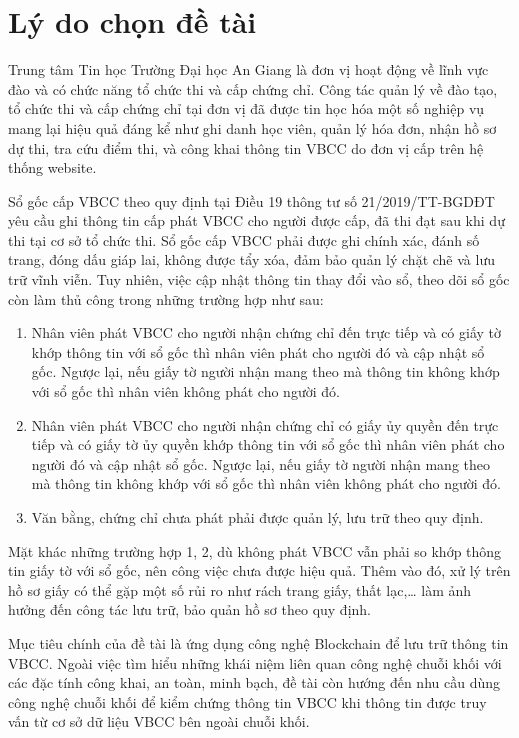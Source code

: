 \section{Lý do chọn đề tài}

Trung tâm Tin học Trường Đại học An Giang là đơn vị hoạt động về lĩnh vực đào và có chức năng tổ chức thi và cấp chứng chỉ.
Công tác quản lý về đào tạo, tổ chức thi và cấp chứng chỉ tại đơn vị đã được tin học hóa một số nghiệp vụ mang lại hiệu quả đáng kể như ghi danh học viên, quản lý hóa đơn, nhận hồ sơ dự thi, tra cứu điểm thi, và công khai thông tin VBCC do đơn vị cấp trên hệ thống website.

Sổ gốc cấp VBCC theo quy định tại Điều 19 thông tư số 21/2019/TT-BGDĐT yêu cầu ghi thông tin cấp phát VBCC cho người được cấp, đã thi đạt sau khi dự thi tại cơ sở tổ chức thi. Sổ gốc cấp VBCC phải được ghi chính xác, đánh số trang, đóng dấu giáp lai, không được tẩy xóa, đảm bảo quản lý chặt chẽ và lưu trữ vĩnh viễn. Tuy nhiên, việc cập nhật thông tin thay đổi vào sổ, theo dõi sổ gốc còn làm thủ công trong những trường hợp như sau:

\begin{enumerate}
\item Nhân viên phát VBCC cho người nhận chứng chỉ đến trực tiếp và có giấy tờ khớp thông tin với sổ gốc thì nhân viên phát cho người đó và cập nhật sổ gốc. Ngược lại, nếu giấy tờ người nhận mang theo mà thông tin không khớp với sổ gốc thì nhân viên không phát cho người đó.

\item Nhân viên phát VBCC cho người nhận chứng chỉ có giấy ủy quyền đến trực tiếp và có giấy tờ ủy quyền khớp thông tin với sổ gốc thì nhân viên phát cho người đó và cập nhật sổ gốc. Ngược lại, nếu giấy tờ người nhận mang theo mà thông tin không khớp với sổ gốc thì nhân viên không phát cho người đó.

\item Văn bằng, chứng chỉ chưa phát phải được quản lý, lưu trữ theo quy định.
\end{enumerate}

Mặt khác những trường hợp 1, 2, dù không phát VBCC vẫn phải so khớp thông tin giấy tờ với sổ gốc, nên công việc chưa được hiệu quả. Thêm vào đó, xử lý trên hồ sơ giấy có thể gặp một số rủi ro như rách trang giấy, thất lạc,\ldots{} làm ảnh hưởng đến công tác lưu trữ, bảo quản hồ sơ theo quy định.

Mục tiêu chính của đề tài là ứng dụng công nghệ Blockchain để lưu trữ thông tin VBCC. Ngoài việc tìm hiểu những khái niệm liên quan công nghệ chuỗi khối với các đặc tính công khai, an toàn, minh bạch, đề tài còn hướng đến nhu cầu dùng công nghệ chuỗi khối để kiểm chứng thông tin VBCC khi thông tin được truy vấn từ cơ sở dữ liệu VBCC bên ngoài chuỗi khối.

